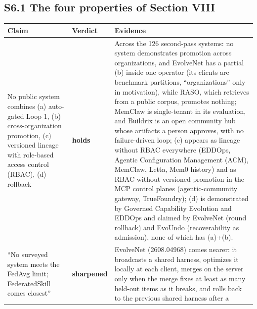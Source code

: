 \documentclass[
]{article}
\newcounter{none} %
\begin{document}
\subsection{S6.1 The four properties of Section
VIII}\label{s6.1-the-four-properties-of-section-viii}

{\def\LTcaptype{none} %
\begin{longtable}[]{@{}
  >{\raggedright\arraybackslash}p{}
  >{\raggedright\arraybackslash}p{}
  >{\raggedright\arraybackslash}p{}@{}}
\toprule\noalign{}
\begin{minipage}[b]{\linewidth}\raggedright
Claim
\end{minipage} & \begin{minipage}[b]{\linewidth}\raggedright
Verdict
\end{minipage} & \begin{minipage}[b]{\linewidth}\raggedright
Evidence
\end{minipage} \\
\midrule\noalign{}
\endhead
\bottomrule\noalign{}
\endlastfoot
No public system combines (a) auto-gated Loop 1, (b) cross-organization
promotion, (c) versioned lineage with role-based access control (RBAC),
(d) rollback & \textbf{holds} & Across the 126 second-pass systems: no
system demonstrates promotion across organizations, and EvolveNet has a
partial (b) inside one operator (its clients are benchmark partitions,
``organizations'' only in motivation), while RASO, which retrieves from
a public corpus, promotes nothing; MemClaw is single-tenant in its
evaluation, and Buildrix is an open community hub whose artifacts a
person approves, with no failure-driven loop; (c) appears as lineage
without RBAC everywhere (EDDOps, Agentic Configuration Management (ACM),
MemClaw, Letta, Mem0 history) and as RBAC without versioned promotion in
the MCP control planes (agentic-community gateway, TrueFoundry); (d) is
demonstrated by Governed Capability Evolution and EDDOps and claimed by
EvolveNet (round rollback) and EvoUndo (recoverability as admission),
none of which has (a)+(b). \\
``No surveyed system meets the FedAvg limit; FederatedSkill comes
closest'' & \textbf{sharpened} & EvolveNet (2608.04968) comes nearer: it
broadcasts a shared harness, optimizes it locally at each client, merges
on the server only when the merge fixes at least as many held-out items
as it breaks, and rolls back to the previous shared harness after a

\end{longtable}}
\end{document}
